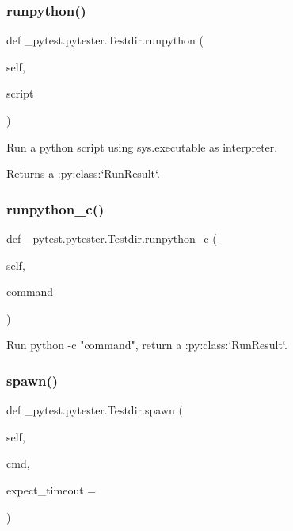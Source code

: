 \subsubsection{\texorpdfstring{runpython()}{runpython()}}
{\footnotesize\ttfamily def \+\_\+pytest.\+pytester.\+Testdir.\+runpython (\begin{DoxyParamCaption}\item[{}]{self,  }\item[{}]{script }\end{DoxyParamCaption})}

\begin{DoxyVerb}Run a python script using sys.executable as interpreter.

Returns a :py:class:`RunResult`.\end{DoxyVerb}
 \mbox{\label{class__pytest_1_1pytester_1_1_testdir_ac509aea7fa82c024a5a23e9caef87c2c}} 
\subsubsection{\texorpdfstring{runpython\+\_\+c()}{runpython\_c()}}
{\footnotesize\ttfamily def \+\_\+pytest.\+pytester.\+Testdir.\+runpython\+\_\+c (\begin{DoxyParamCaption}\item[{}]{self,  }\item[{}]{command }\end{DoxyParamCaption})}

\begin{DoxyVerb}Run python -c "command", return a :py:class:`RunResult`.\end{DoxyVerb}
 \mbox{\label{class__pytest_1_1pytester_1_1_testdir_a84e7360700c799b35f2b3d783331290e}} 
\subsubsection{\texorpdfstring{spawn()}{spawn()}}
{\footnotesize\ttfamily def \+\_\+pytest.\+pytester.\+Testdir.\+spawn (\begin{DoxyParamCaption}\item[{}]{self,  }\item[{}]{cmd,  }\item[{}]{expect\+\_\+timeout = {} }\end{DoxyParamCaption})}

